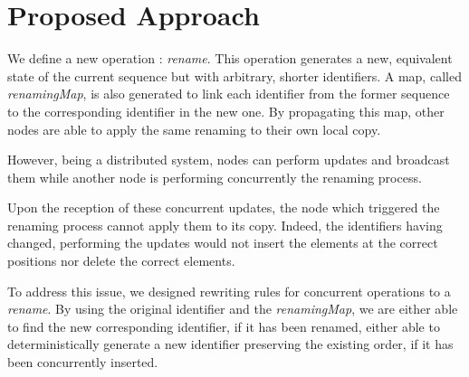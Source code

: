 \documentclass[sigplan]{acmart}
\begin{document}
\section{Proposed Approach}




We define a new operation : \emph{rename}.
This operation generates a new, equivalent state of the current sequence but with arbitrary, shorter identifiers.
A map, called \emph{renamingMap}, is also generated to link each identifier from the former sequence to the corresponding identifier in the new one.
By propagating this map, other nodes are able to apply the same renaming to their own local copy.

However, being a distributed system, nodes can perform updates and broadcast them while another node is performing concurrently the renaming process.

Upon the reception of these concurrent updates, the node which triggered the renaming process cannot apply them to its copy.
Indeed, the identifiers having changed, performing the updates would not insert the elements at the correct positions nor delete the correct elements.

To address this issue, we designed rewriting rules for concurrent operations to a \emph{rename}.
By using the original identifier and the \emph{renamingMap}, we are either able to find the new corresponding identifier, if it has been renamed, either able to deterministically generate a new identifier preserving the existing order, if it has been concurrently inserted.
\end{document}

